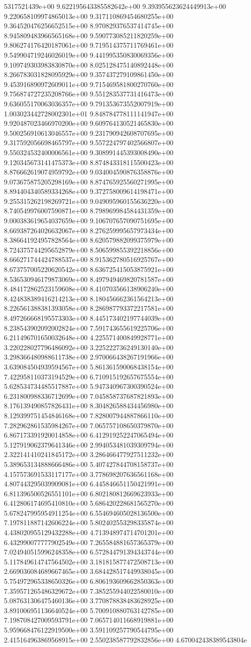5317521439e+00	9.622195643385582642e+00	9.393955623624449913e+00	9.220658109974865013e+00	9.317110869454680255e+00	9.364520476256652515e+00	8.970829376537414745e+00	8.945809483966565168e+00	9.590773085211820259e+00	9.806274176420187061e+00	9.719514375711769461e+00	9.549904719246026019e+00	9.441995350830069356e+00	9.109749303983830870e+00	8.025128475140892448e+00	8.266783031828095929e+00	9.357437279109861450e+00	9.453916890972609011e+00	9.715469581800270760e+00	9.756874727235208766e+00	9.551283537731416473e+00	9.636055170063036357e+00	9.791353673552007919e+00	1.003023442728002301e+01	9.848784778111141947e+00	9.920487023466970200e+00	9.609764130521465830e+00	9.500256910613046557e+00	9.231790942608707695e+00	9.317592056698465797e+00	9.557224797402566807e+00	9.550324532400006561e+00	9.308991445393008490e+00	9.120345673141475373e+00	8.874843318115500423e+00	8.876662619074959792e+00	9.034004590876358876e+00	9.073675875205298169e+00	8.874765925560271995e+00	8.894404340589334268e+00	9.372758009614198471e+00	9.255315262198269721e+00	9.049095960155636220e+00	8.740549976007590871e+00	8.798969984584431359e+00	9.000383619654037659e+00	9.106707657090751695e+00	8.669387264026632067e+00	8.276259995657973434e+00	8.386641924957828564e+00	8.620579882099375979e+00	8.724375744295652879e+00	8.506599855392218856e+00	8.666271744424788537e+00	8.915362780516925767e+00	8.673757005220620542e+00	8.636725415053875921e+00	8.536530946179873069e+00	8.497949469820781587e+00	8.484172862523159608e+00	8.410703566138906240e+00	8.424838389416214213e+00	8.180456662361564213e+00	8.226561388381393058e+00	8.286987793372217581e+00	8.497266668195573303e+00	8.445173402197744039e+00	8.238543902092002824e+00	7.591743655619225706e+00	6.211496701650032648e+00	4.225571400849928771e+00	3.220228027796486092e+00	3.225222736249130140e+00	3.298366480988611738e+00	2.970066438267191966e+00	3.639084504939594567e+00	5.861361590068438154e+00	7.422958110373194529e+00	6.710915192657675554e+00	5.628534734485517887e+00	5.947340967300390524e+00	6.231800988336712699e+00	7.045858737687821893e+00	8.176139490857826431e+00	8.304826588434456980e+00	8.129399751454846168e+00	7.828007944887866110e+00	7.282962861535984267e+00	7.065757108650379870e+00	6.867173391920014858e+00	6.412919252247065494e+00	5.127919062379641346e+00	2.994053481039309794e+00	2.322141410241845172e+00	3.286466477927511232e+00	5.389653134888666486e+00	5.407427844708158737e+00	4.157573691533117177e+00	3.778698207636561168e+00	4.807443295039909081e+00	6.445846651150421991e+00	6.811396500526551101e+00	6.802180812669623933e+00	6.412806174695410810e+00	5.686420228681565270e+00	5.678247995954911254e+00	6.554694605028136500e+00	7.197811887142606224e+00	5.802402553298335874e+00	4.438020955129432288e+00	4.713948974714701201e+00	6.432990077777902549e+00	7.265584881657365379e+00	7.024940515996248358e+00	6.572844791394343744e+00	5.117849614747564502e+00	3.181815877472508713e+00	2.669036084689667465e+00	3.684428517449938045e+00	5.754972965338650326e+00	6.806193609662850363e+00	7.359571265486329672e+00	7.385255944022580010e+00	5.087631306475460136e+00	3.770878838483628925e+00	3.891006951136640524e+00	5.700910880763142785e+00	7.198708427009593791e+00	7.065714011668919881e+00	5.959668476122919500e+00	3.591109257790544795e+00	2.415164963869568915e+00	2.550238587792832856e+00	4.670042438389543804e